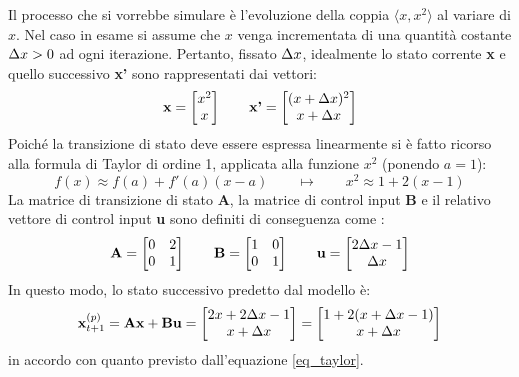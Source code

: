 Il processo che si vorrebbe simulare è l'evoluzione della coppia $\langle x, x^2 \rangle$ al variare di $x$. Nel caso in esame si assume che $x$ venga incrementata di una quantità costante $\Delta x > 0$ ad ogni iterazione. Pertanto, fissato $\Delta x$, idealmente lo stato corrente \textbf{x} e quello successivo \textbf{x'} sono rappresentati dai vettori:
\begin{equation*}
\textbf{x} = 
\begin{bmatrix}
x^2 \\
x \\
\end{bmatrix}
\qquad
\textbf{x'} = 
\begin{bmatrix}
(x + \Delta x)^2 \\
x + \Delta x \\
\end{bmatrix}
\end{equation*}
Poiché la transizione di stato deve essere espressa linearmente si è fatto ricorso alla formula di Taylor di ordine 1, applicata alla funzione $x^2$ (ponendo $a = 1$):
\begin{equation}
\label{eq_taylor}
f(x) \approx f(a) + f'(a)(x-a) \qquad \mapsto  \qquad x^2 \approx 1 + 2(x-1)
\end{equation}
La matrice di transizione di stato \textbf{A}, la matrice di control input \textbf{B} e il relativo vettore di control input \textbf{u} sono definiti di conseguenza come :
\begin{equation*}
\textbf{A} = 
\begin{bmatrix}
0 & 2 \\
0 & 1 \\
\end{bmatrix}
\qquad 
\textbf{B} = 
\begin{bmatrix}
1 & 0\\
0 & 1\\
\end{bmatrix}
\qquad 
\textbf{u} = 
\begin{bmatrix}
2\Delta x -1 \\
\Delta x \\
\end{bmatrix}
\end{equation*}
In questo modo, lo stato successivo predetto dal modello è:
\begin{equation*}
\mathbf{x}^{(p)}_{t+1} = \mathbf{A x + B u} = 
\begin{bmatrix}
2x + 2\Delta x -1 \\
x + \Delta x \\
\end{bmatrix}  = 
\begin{bmatrix}
1 + 2(x + \Delta x -1) \\
x + \Delta x \\
\end{bmatrix} 
\end{equation*}
in accordo con quanto previsto dall'equazione \ref{eq_taylor}.

